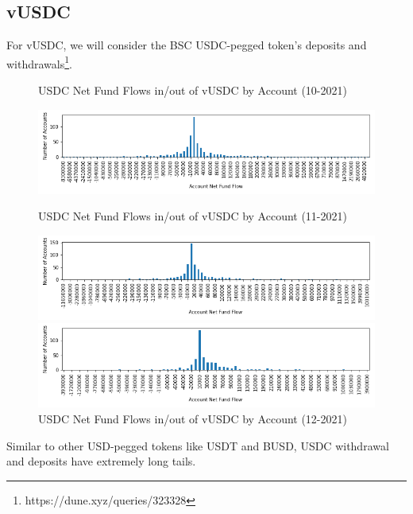\documentclass[12pt]{article}
\begin{document}
        \subsection*{vUSDC}
            For vUSDC, we will consider the BSC USDC-pegged token's deposits and withdrawals\footnote{https://dune.xyz/queries/323328}.
            \begin{figure}[h]
                \caption{USDC Net Fund Flows in/out of vUSDC by Account (10-2021) \label{overflow}}
                \centering
                \hspace*{-1in}
                \includegraphics[width=0.8\paperwidth]{net-fundflow-accountdist-vUSDC-10-2021.png}

                \caption{USDC Net Fund Flows in/out of vUSDC by Account (11-2021) \label{overflow}}
                \centering
                \hspace*{-1in}
                \includegraphics[width=0.8\paperwidth]{net-fundflow-accountdist-vUSDC-11-2021.png}

                \caption{USDC Net Fund Flows in/out of vUSDC by Account (12-2021) \label{overflow}}
                \centering
                \hspace*{-1in}
                \includegraphics[width=0.8\paperwidth]{net-fundflow-accountdist-vUSDC-12-2021.png}
            \end{figure}

            Similar to other USD-pegged tokens like USDT and BUSD, USDC withdrawal and deposits have extremely long tails.
            \clearpage
        
\end{document}
